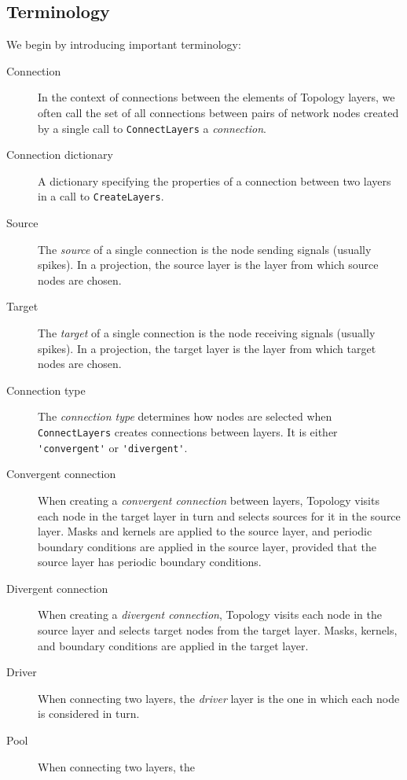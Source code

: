 \documentclass[a4paper,12pt]{report}
\begin{document}
\subsection{Terminology}\label{sec:terminology}
We begin by introducing important terminology:
\begin{description}
\item[Connection] In the context of connections
  between the elements of Topology layers, we often call the set of all connections
  between pairs of network nodes created by a single call to
  \lstinline!ConnectLayers! a \emph{connection}.
\item[Connection dictionary] A dictionary
  specifying the properties of a connection between two layers in a call to
  \lstinline!CreateLayers!.
\item[Source] The \emph{source} of a single connection
  is the node sending signals (usually spikes). In a projection, the
  source layer is the layer from which source nodes
  are chosen.
\item[Target]
The \emph{target} of a single connection
  is the node receiving signals (usually spikes). In a projection, the
  target layer is the layer from which target nodes
  are chosen.
\item[Connection type] The \emph{connection
    type} determines how nodes are selected when
  \lstinline!ConnectLayers! creates connections between layers. It is
  either \lstinline!'convergent'! or \lstinline!'divergent'!.
\item[Convergent connection] When
  creating a \emph{convergent connection} between layers, Topology
  visits each node in the target layer in turn and selects sources for
  it in the source layer. Masks and kernels are applied to the source
  layer, and periodic boundary conditions are applied in the source
  layer, provided that the source layer has periodic boundary conditions.
\item[Divergent connection] When creating
  a \emph{divergent connection}, Topology visits each node in the
  source layer and selects target nodes from the target layer. Masks, kernels, and
  boundary conditions are applied in the target layer.
\item[Driver] When connecting two layers, the
  \emph{driver} layer is the one in which each node is considered in
  turn.
\item[Pool] When connecting two layers, the

\end{description}
\end{document}
